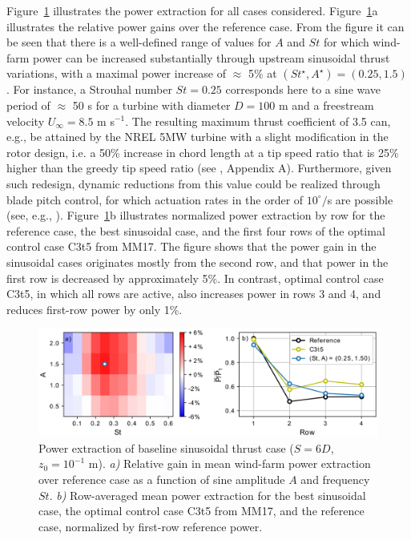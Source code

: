 \documentclass[wes, manuscript]{copernicus}
\newcommand{\revision}[1]{{\color{blue} #1}}
\begin{document}
Figure~\ref{fig:sinus_baseline} illustrates the power extraction for all cases considered. Figure~\ref{fig:sinus_baseline}a illustrates the relative power gains over the reference case. From the figure it can be seen that there is a well-defined range of values for $A$ and $St$ for which wind-farm power can be increased substantially through upstream sinusoidal thrust variations, with a maximal power increase of $\approx$ 5\% at $(St^\star, A^\star) = (0.25, 1.5)$. For instance, a Strouhal number $St = 0.25$ corresponds here to a sine wave period of $\approx$ 50 s for a turbine with diameter $D = 100$ m and a freestream velocity $U_\infty = 8.5$ m s$^{-1}$. The resulting maximum thrust coefficient of 3.5 can, e.g., be \revision{attained by the NREL 5MW turbine with a slight modification in the rotor design}, i.e. a 50\% increase in chord length at a tip speed ratio that is 25\% higher than the greedy tip speed ratio (see \citealp{goit2015optimal}, Appendix A). \revision{Furthermore, given such redesign, dynamic reductions from this value could be realized through blade pitch control, for which actuation rates in the order of $10^\circ/$s are possible (see, e.g., \citealp{jonkman2009definition}).} Figure~\ref{fig:sinus_baseline}b illustrates normalized power extraction by row for the reference case, the best sinusoidal case, and the first four rows of the optimal control case C3t5 from MM17. The figure shows that the power gain in the sinusoidal cases originates mostly from the second row, and that power in the first row is decreased by approximately 5\%. In contrast, optimal control case C3t5, in which all rows are active, also increases power in rows 3 and 4, and reduces first-row power by only 1\%. 
\begin{figure}
	\centering
	\includegraphics[width=\textwidth]{figure14}
	\caption{Power extraction of baseline sinusoidal thrust case ($S = 6D$, $z_0 = 10^{-1}$ m). \emph{a) } Relative gain in mean wind-farm power extraction over reference case as a function of sine amplitude $A$ and frequency $St$. \emph{b) } Row-averaged mean power extraction for the best sinusoidal case, the optimal control case C3t5 from MM17, and the reference case, normalized by first-row reference power.\label{fig:sinus_baseline} }
\end{figure}
\end{document}

